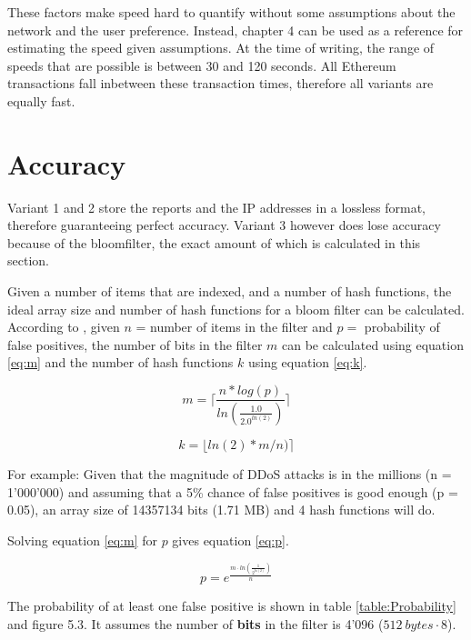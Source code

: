 These factors make speed hard to quantify without some  assumptions about the network and the user preference. Instead, chapter 4 can be used as a reference for estimating the speed given assumptions. At the time of writing, the range of speeds that are possible is between 30 and 120 seconds. All Ethereum transactions fall inbetween these transaction times, therefore all variants are equally fast.

\section{Accuracy}

Variant 1 and 2 store the reports and the IP addresses in a lossless format, therefore guaranteeing perfect accuracy. Variant 3 however does lose accuracy because of the bloomfilter, the exact amount of which is calculated in this section.

Given a number of items that are indexed, and a number of hash functions, the ideal array size and number of hash functions for a bloom filter can be calculated. According to \cite{BloomfilterAccuracy}, given $n$ = number of items in the filter and $p =$ probability of false positives, the number of bits in the filter $m$ can be calculated using equation \ref{eq:m} and the number of hash functions $k$ using equation \ref{eq:k}. 

\begin{equation}
m = \lceil\frac{n * log(p)}{ln(\frac{1.0}{2.0 ^{ln(2)}})}\rceil
\label{eq:m}
\end{equation}

\begin{equation}
k = \lfloor ln(2) * m / n) \rceil
\label{eq:k}
\end{equation}

For example: Given that the magnitude of DDoS attacks is in the millions (n = 1'000'000) and assuming that a 5\% chance of false positives is good enough (p = 0.05), an array size of 14357134 bits (1.71 MB) and 4 hash functions will do.

Solving equation \ref{eq:m} for $p$ gives equation \ref{eq:p}.

\begin{equation}
p = e^{\frac{{m \cdot ln(\frac{1}{2^{ln(2)}})}}{n}}
\label{eq:p}
\end{equation}

The probability of at least one false positive is shown in table \ref{table:Probability} and figure 5.3. It assumes the number of \textbf{bits} in the filter is 4'096 ($512\ bytes \cdot 8$).

